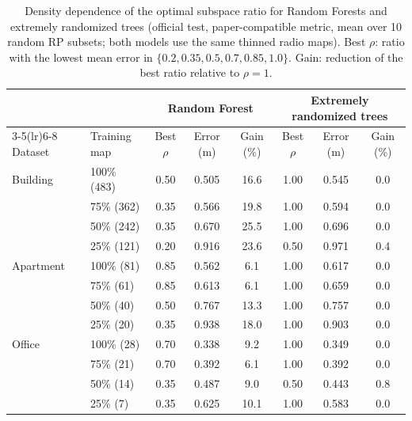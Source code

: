 \begin{table}[!t]
\centering
\caption{Density dependence of the optimal subspace ratio for Random Forests and extremely randomized trees (official test, paper-compatible metric, mean over 10 random RP subsets; both models use the same thinned radio maps). Best $\rho$: ratio with the lowest mean error in $\{0.2,0.35,0.5,0.7,0.85,1.0\}$. Gain: reduction of the best ratio relative to $\rho=1$.}
\label{tab:density_rf_et}
\footnotesize
\setlength{\tabcolsep}{4pt}
\begin{tabular}{llcccccc}
\toprule
 & & \multicolumn{3}{c}{Random Forest} & \multicolumn{3}{c}{Extremely randomized trees} \\
\cmidrule(lr){3-5}\cmidrule(lr){6-8}
Dataset & Training map & Best $\rho$ & Error (m) & Gain (\%) & Best $\rho$ & Error (m) & Gain (\%) \\
\midrule
Building & 100\% (483) & 0.50 & 0.505 & 16.6 & 1.00 & 0.545 & 0.0 \\
 & 75\% (362) & 0.35 & 0.566 & 19.8 & 1.00 & 0.594 & 0.0 \\
 & 50\% (242) & 0.35 & 0.670 & 25.5 & 1.00 & 0.696 & 0.0 \\
 & 25\% (121) & 0.20 & 0.916 & 23.6 & 0.50 & 0.971 & 0.4 \\
\midrule
Apartment & 100\% (81) & 0.85 & 0.562 & 6.1 & 1.00 & 0.617 & 0.0 \\
 & 75\% (61) & 0.85 & 0.613 & 6.1 & 1.00 & 0.659 & 0.0 \\
 & 50\% (40) & 0.50 & 0.767 & 13.3 & 1.00 & 0.757 & 0.0 \\
 & 25\% (20) & 0.35 & 0.938 & 18.0 & 1.00 & 0.903 & 0.0 \\
\midrule
Office & 100\% (28) & 0.70 & 0.338 & 9.2 & 1.00 & 0.349 & 0.0 \\
 & 75\% (21) & 0.70 & 0.392 & 6.1 & 1.00 & 0.392 & 0.0 \\
 & 50\% (14) & 0.35 & 0.487 & 9.0 & 0.50 & 0.443 & 0.8 \\
 & 25\% (7) & 0.35 & 0.625 & 10.1 & 1.00 & 0.583 & 0.0 \\
\bottomrule
\end{tabular}
\end{table}
